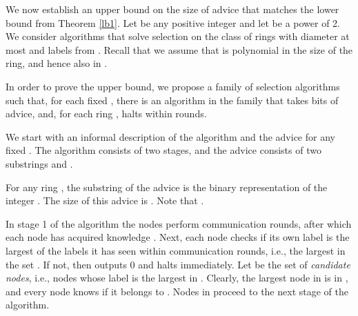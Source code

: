 \documentclass[11pt]{article}
\newtheorem{lemma}{Lemma}[section]
\newtheorem{claim}{Claim}[section]
\newtheorem{definition}{Definition}[section]
\begin{document}
\begin{comment}
\begin{claim}
 is a permissible colouring.
\end{claim}


\begin{definition}
Consider any colouring  of . For any  and any , let , and let . Let , and let .
\end{definition}

\begin{lemma}\label{atmost}
In any legal colouring of a -clique, for any colour :
\begin{enumerate}
\item At most  nodes  have  or at most  nodes  have , and,
\item At most  nodes  have  or at most  nodes  have ,
\end{enumerate}
\end{lemma}









\end{proof}

\end{comment}




We now establish an upper bound on the size of advice that matches the lower bound from Theorem \ref{lb1}.
Let  be any positive integer and let   be a power of 2.  We consider algorithms that solve selection on the class of rings with diameter at most  and labels from . Recall that we assume that  is polynomial in the size of the ring, and hence also in .



In order to prove the upper bound, we propose a family of selection algorithms such that, for each fixed , there is an algorithm in the family that takes  bits of advice, and, for each ring , halts within  rounds. 

We start with an informal description of the algorithm and the advice for any fixed . The algorithm consists of two stages, and the advice consists of two substrings  and .

For any ring , the substring  of the advice is the binary representation of the integer . The size of this advice is . Note that .

In stage 1 of the algorithm the nodes perform  communication rounds, after which each node  has acquired knowledge . Next, each node  checks if its own label is the largest of the labels it has seen within  communication rounds, i.e., the largest in the set . If not, then  outputs 0 and halts immediately. 
Let  be the set of {\em candidate nodes}, i.e., nodes  whose label is the largest in . Clearly, the largest node in  is in , and every node knows if it belongs to
 . Nodes in  proceed to the next stage of the algorithm. 
\end{document}
